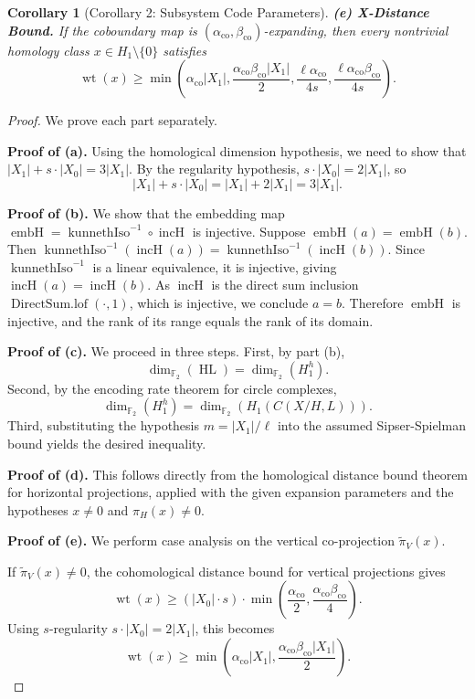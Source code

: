 \documentclass[11pt]{article}
\theoremstyle{plain}
\newtheorem*{corollary}{Corollary}
\theoremstyle{definition}
\theoremstyle{remark}
\begin{document}
\begin{corollary}[Corollary 2: Subsystem Code Parameters]
\textbf{(e) X-Distance Bound.} If the coboundary map is $(\alpha_{\mathrm{co}}, \beta_{\mathrm{co}})$-expanding, then every nontrivial homology class $x \in H_1 \setminus \{0\}$ satisfies
\[
\operatorname{wt}(x) \geq \min\left(\alpha_{\mathrm{co}} |X_1|, \frac{\alpha_{\mathrm{co}} \beta_{\mathrm{co}} |X_1|}{2}, \frac{\ell \alpha_{\mathrm{co}}}{4s}, \frac{\ell \alpha_{\mathrm{co}} \beta_{\mathrm{co}}}{4s}\right).
\]
\end{corollary}

\begin{proof}
We prove each part separately.

\textbf{Proof of (a).} Using the homological dimension hypothesis, we need to show that $|X_1| + s \cdot |X_0| = 3|X_1|$. By the regularity hypothesis, $s \cdot |X_0| = 2|X_1|$, so 
\[
|X_1| + s \cdot |X_0| = |X_1| + 2|X_1| = 3|X_1|.
\]

\textbf{Proof of (b).} We show that the embedding map $\operatorname{embH} = \operatorname{kunnethIso}^{-1} \circ \operatorname{incH}$ is injective. Suppose $\operatorname{embH}(a) = \operatorname{embH}(b)$. Then $\operatorname{kunnethIso}^{-1}(\operatorname{incH}(a)) = \operatorname{kunnethIso}^{-1}(\operatorname{incH}(b))$. Since $\operatorname{kunnethIso}^{-1}$ is a linear equivalence, it is injective, giving $\operatorname{incH}(a) = \operatorname{incH}(b)$. As $\operatorname{incH}$ is the direct sum inclusion $\operatorname{DirectSum.lof}(\cdot, 1)$, which is injective, we conclude $a = b$. Therefore $\operatorname{embH}$ is injective, and the rank of its range equals the rank of its domain.

\textbf{Proof of (c).} We proceed in three steps. First, by part (b), 
\[
\dim_{\mathbb{F}_2}(\operatorname{HL}) = \dim_{\mathbb{F}_2}(H_1^h).
\]
Second, by the encoding rate theorem for circle complexes,
\[
\dim_{\mathbb{F}_2}(H_1^h) = \dim_{\mathbb{F}_2}(H_1(C(X/H, L))).
\]
Third, substituting the hypothesis $m = |X_1|/\ell$ into the assumed Sipser-Spielman bound yields the desired inequality.

\textbf{Proof of (d).} This follows directly from the homological distance bound theorem for horizontal projections, applied with the given expansion parameters and the hypotheses $x \neq 0$ and $\pi_H(x) \neq 0$.

\textbf{Proof of (e).} We perform case analysis on the vertical co-projection $\tilde\pi_V(x)$. 

If $\tilde\pi_V(x) \neq 0$, the cohomological distance bound for vertical projections gives
\[
\operatorname{wt}(x) \geq (|X_0| \cdot s) \cdot \min\left(\frac{\alpha_{\mathrm{co}}}{2}, \frac{\alpha_{\mathrm{co}} \beta_{\mathrm{co}}}{4}\right).
\]
Using $s$-regularity $s \cdot |X_0| = 2|X_1|$, this becomes
\[
\operatorname{wt}(x) \geq \min\left(\alpha_{\mathrm{co}} |X_1|, \frac{\alpha_{\mathrm{co}} \beta_{\mathrm{co}} |X_1|}{2}\right).
\]


\end{proof}
\end{document}
